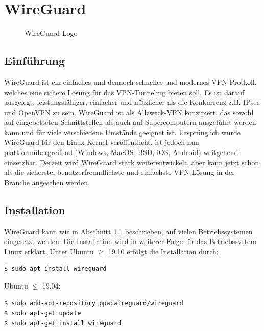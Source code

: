
\chapter{WireGuard}
\begin{figure}[htbp]
  \centering
  
  \caption{WireGuard Logo}
\end{figure}

\section{Einführung} %
\label{einfuehrung}
WireGuard ist ein einfaches und dennoch schnelles und modernes VPN-Protkoll, welches eine sichere Lösung für das VPN-Tunneling bieten soll. Es ist darauf ausgelegt, leistungsfähiger, einfacher und nützlicher als die Konkurrenz z.B. IPsec und OpenVPN zu sein. WireGuard ist als Allzweck-VPN konzipiert, das sowohl auf eingebetteten Schnittstellen als auch auf Supercomputern ausgeführt werden kann und für viele verschiedene Umstände geeignet ist.  \newline\newline
Ursprünglich wurde WireGuard für den Linux-Kernel veröffentlicht, ist jedoch nun plattformübergreifend (Windows, MacOS, BSD, iOS, Android) weitgehend einsetzbar. Derzeit wird WireGuard stark weiterentwickelt, aber kann jetzt schon als die sicherste, benutzerfreundlichste und einfachste VPN-Lösung in der Branche angesehen werden.

\section{Installation} 
\label{installation}
WireGuard kann wie in Abschnitt \ref{einfuehrung} beschrieben, auf vielen Betriebssystemen eingesetzt werden. Die Installation wird in weiterer Folge für das Betriebssystem Linux erklärt. \newline\newline
Unter Ubuntu $\geq$ 19.10 erfolgt die Installation durch:
\begin{lstlisting}
$ sudo apt install wireguard
\end{lstlisting}
Ubuntu $\leq$ 19.04:
\begin{lstlisting}
$ sudo add-apt-repository ppa:wireguard/wireguard
$ sudo apt-get update
$ sudo apt-get install wireguard
\end{lstlisting}

